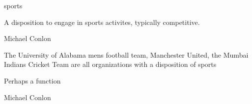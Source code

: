 \documentclass[letterpaper,10pt,english]{sphinxmanual}
\begin{document}
\begin{sphinxShadowBox}

\sphinxAtStartPar
sports
\end{sphinxShadowBox}

\begin{sphinxShadowBox}

\sphinxAtStartPar
{\hyperref[\detokenize{doc-BFO_0000016::doc}]{}}
\end{sphinxShadowBox}

\begin{sphinxShadowBox}

\sphinxAtStartPar
A disposition to engage in sports activites, typically competitive.
\end{sphinxShadowBox}

\begin{sphinxShadowBox}

\sphinxAtStartPar
Michael Conlon 
\end{sphinxShadowBox}

\begin{sphinxShadowBox}

\sphinxAtStartPar
The University of Alabama mens football team, Manchester United, the Mumbai Indians Cricket Team are all organizations with a disposition of sports
\end{sphinxShadowBox}

\begin{sphinxShadowBox}

\sphinxAtStartPar
Perhaps a function
\end{sphinxShadowBox}

\begin{sphinxShadowBox}

\sphinxAtStartPar
Michael Conlon 
\end{sphinxShadowBox}
\begin{quote}

\ignorespaces \end{quote}
\end{document}
